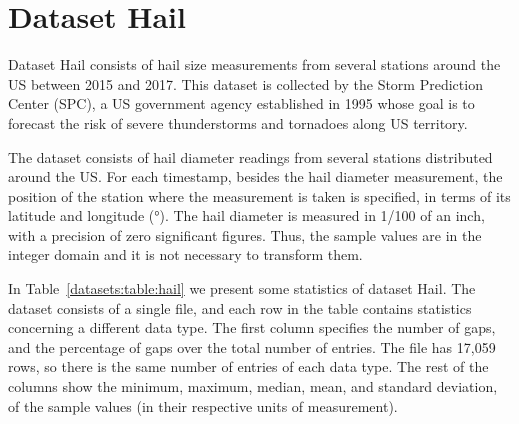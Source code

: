 
\vspace{-10pt}
\section{Dataset Hail}
\label{datasets:hail}
\newcommand{\SPCDef}{This dataset is collected by the Storm Prediction Center (SPC), a US government agency established in 1995 whose goal is to forecast the risk of severe thunderstorms and tornadoes along US territory.}

Dataset Hail \cite{dataset:spc} consists of hail size measurements from several stations around the US between 2015 and 2017. \SPCDef


The dataset consists of hail diameter readings from several stations distributed around the US. For each timestamp, besides the hail diameter measurement, the position of the station where the measurement is taken is specified, in terms of its latitude and longitude (°). The hail diameter is measured in 1/100 of an inch, with a precision of zero significant figures. Thus, the sample values are in the integer domain and it is not necessary to transform them.


In Table~\ref{datasets:table:hail} we present some statistics of dataset Hail. The dataset consists of a single file, and each row in the table contains statistics concerning a different data type. The first column specifies the number of gaps, and the percentage of gaps over the total number of entries. The file has 17,059 rows, so there is the same number of entries of each data type. The rest of the columns show the minimum, maximum, median, mean, and standard deviation, of the sample values (in their respective units of measurement).




